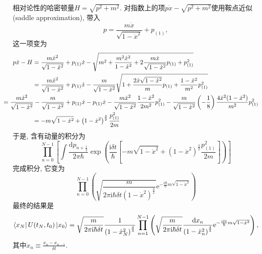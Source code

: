 \documentclass{ctexart}
\begin{document}
相对论性的哈密顿量$H = \sqrt{p^2 + m^2}$. 对指数上的项$p \dot{x} - \sqrt{p^2 + m^2}$使用鞍点近似(saddle approximation),
带入
\begin{equation}
  p = \frac{m \dot{x}}{\sqrt{1 - \dot{x}^2}} + p_{(1)},
\end{equation}
这一项变为
\begin{equation}
  \begin{aligned}
    p \dot{x} - H  
    & = \frac{m \dot{x}^2}{\sqrt{1- \dot{x}^2}}+ p_{(1)} \dot{x}
    - \sqrt{m^2 + \frac{m^2 \dot{x}^2}{1- \dot{x} ^2}+ 2 \frac{m \dot{x}}{\sqrt{1- \dot{x}^2}}p_{(1)} + p_{(1)}^2}
    \\
    & = \frac{m \dot{x}^2}{\sqrt{1- \dot{x}^2}}+ p_{(1)} \dot{x}
    - \frac{m}{\sqrt{1- \dot{x}^2}}\sqrt{ 1 + \frac{2 \dot{x} \sqrt{1- \dot{x}^2}}{m} p_{(1)} + \frac{1- \dot{x}^2}{m^2} p_{(1)}^2}
    \\
    & \kern -5em   = \frac{m \dot{x}^2}{\sqrt{1-\dot{x}^2}}- \frac{m}{\sqrt{1- \dot{x}^2}} + p_{(1)}\dot{x} - p_{(1)} \dot{x} 
    -\frac{m \dot{x}^2}{\sqrt{1- \dot{x}^2}} \frac{1-\dot{x}^2}{2m^2}p_{(1)}^2 - \frac{m}{\sqrt{1- \dot{x}^2}}\left( -\frac{1}{8} \right) \frac{4 \dot{x}^2 (1-\dot{x}^2)}{m^2}p_{(1)}^2
    \\
    & = -m \sqrt{1-\dot{x}^2}+ \left( 1- \dot{x}^2 \right) ^{\frac{3}{2}} \frac{p_{(1)}^2}{2m}
  \end{aligned}
\end{equation}
于是, 含有动量的积分为
\begin{equation}
  \prod_{n=0}^{N-1} \left[ \int\frac{\mathrm{d} p_{n+ \frac{1}{2}}}{2\pi\hbar} \exp\left( \frac{\mathrm{i} \delta t}{\hbar}  \left[ -m \sqrt{1-\dot{x}^2} + \left( 1- \dot{x}^2 \right) ^{\frac{3}{2}} \frac{p_{(1)}^2}{2m} \right]  \right)  \right] 
\end{equation}
完成积分, 它变为
\begin{equation}
  \prod_{n=0}^{N-1} \left(  \sqrt{\frac{ m }{2\pi\mathrm{i} \hbar  \delta t (1-\dot{x}^2)^{\frac{3}{2}}}} \mathrm{e}^{- \frac{\mathrm{i} \delta t }{\hbar}m \sqrt{1- \dot{x}^2}} \right) 
\end{equation}
最终的结果是
\begin{equation}
  \bra{x_N}U(t_N, t_0)\ket{x_0} = \sqrt{\frac{m}{2\pi \mathrm{i} \hbar \delta t}} \frac{1}{\left( 1-\dot{x}_N^2 \right) ^{\frac{4}{3}}} \prod_{n=1}^{N-1} 
  \left( 
    \sqrt{\frac{m}{2\pi \mathrm{i} \hbar \delta t}} \frac{\mathrm{d} x_n}{\left( 1- \dot{x}_n^2 \right) ^{\frac{4}{3}}} \mathrm{e}^{- \frac{\mathrm{i} \delta t}{\hbar}m \sqrt{1-\dot{x}^2}}
   \right) ,
\end{equation}
其中$\dot{x}_n \equiv \frac{x_n - x_{n-1}}{\delta t}$.
\end{document}
